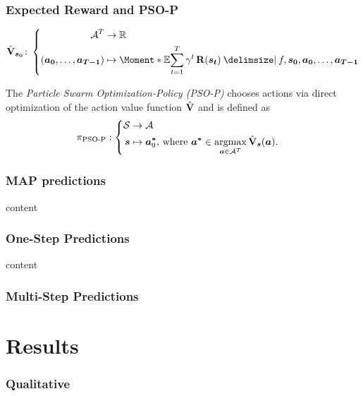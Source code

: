 \begin{frame}[label=solution_psop]
    \frametitle{Expected Reward and PSO-P}

    \begin{align}
        \label{eq:action_value_function}
        \AVlu_{\mat{s_0}} \colon \left\{
            \begin{aligned}
                \Ah^T &\to \R \\
                \left( \mat{a_0}, \dots, \mat{a_{T-1}} \right) &\mapsto \Moment*{\E}{\sum_{t=1}^T \gamma^t \Rwd(\mat{s_t}) \given f, \mat{s_0}, \mat{a_0}, \dots, \mat{a_{T-1}}}
            \end{aligned}
            \right.
        \end{align}

    \begin{definition}[PSO-P]
        \label{def:psop}
        The \emph{Particle Swarm Optimization-Policy (PSO-P)} chooses actions via direct optimization of the action value function $\operatorname{\hat{\operatorname{\mathbf{V}}}}$ and is defined as
        \begin{align}
            \pi_{\text{PSO-P}} &: \left\{
            \begin{aligned}
                \mathcal{S} &\to \mathcal{A}\\
                \bm{s} &\mapsto \bm{a^\ast}_0 \text{, where } \bm{a^\ast} \in \operatorname*{argmax}_{\bm{a} \in \mathcal{A}^T} \operatorname{\hat{\operatorname{\mathbf{V}}}}_{\bm{s}}(\bm{a}).
            \end{aligned}
            \right.
        \end{align}
    \end{definition}
\end{frame}

\begin{frame}[label=solution_map]
    \frametitle{MAP predictions}

    content
\end{frame}

\begin{frame}[label=solution_os]
    \frametitle{One-Step Predictions}

    content
\end{frame}

\begin{frame}[label=solution_ms]
    \frametitle{Multi-Step Predictions}

    \centering
\end{frame}

\section{Results}
\begin{frame}[label=results_qualitative]
    \frametitle{Qualitative}

\end{frame}

